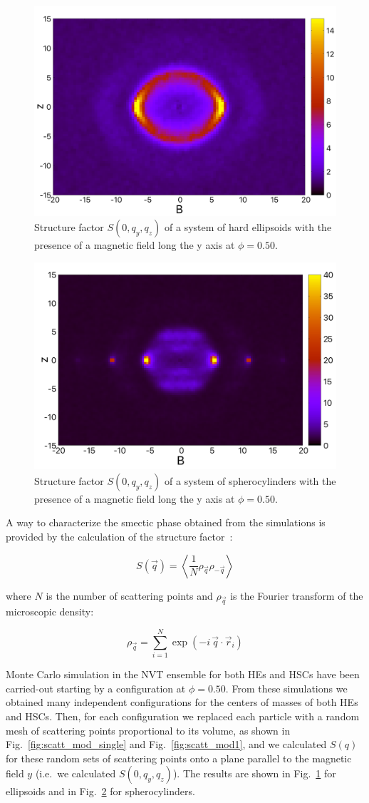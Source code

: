 \documentclass[aip,graphicx]{revtex4-1} %
\begin{document}
\begin{figure}
    \centering
    \includegraphics[width=0.5\columnwidth]{Syz_B_HE.png}
    \caption{Structure factor $S(0, q_y, q_z)$ of a system of hard ellipsoids with the presence of a magnetic field long the y axis at $\phi=0.50$.}\label{fig:Syz_B_HE}
\end{figure}

\begin{figure}
    \centering
    \includegraphics[width=0.5\columnwidth]{Syz_B.png}
    \caption{Structure factor $S(0, q_y, q_z)$ of a system of spherocylinders with the presence of a magnetic field long the y axis at $\phi=0.50$.}\label{fig:Syz_B_HSC}
\end{figure}

A way to characterize the smectic phase obtained from the simulations is provided by the calculation of the structure factor~\cite{Hansen_McDonald}:

\begin{equation}\label{eq:S_q}
    S( \vec{q} ) = \left\langle \frac{1}{N} \rho_{\vec{q}} \rho_{-\vec{q}} \right\rangle 
\end{equation}

where $N$ is the number of scattering points and $\rho_{\vec{q}}$ is the Fourier transform of the microscopic density:

\begin{equation}
    \rho_{\vec{q}} = \sum_{i=1}^N \exp(-i\, \vec{q} \cdot \vec{r}_i)
\end{equation}

Monte Carlo simulation in the NVT ensemble for both HEs and HSCs have been carried-out 
starting by a configuration at $\phi = 0.50$.
From these simulations we obtained many independent configurations for the centers of masses of both HEs and HSCs. 
Then, for each configuration we replaced each particle with a random mesh of scattering points proportional to its volume, 
as shown in Fig.~\ref{fig:scatt_mod_single} and Fig.~\ref{fig:scatt_mod1}, and we calculated $S(q)$ for these random
sets of scattering points onto a plane parallel to the magnetic field $y$ (i.e.~we calculated $S(0, q_y, q_z)$). 
The results are shown in Fig.~\ref{fig:Syz_B_HE} for ellipsoids and in Fig.~\ref{fig:Syz_B_HSC} for spherocylinders.
\end{document}
